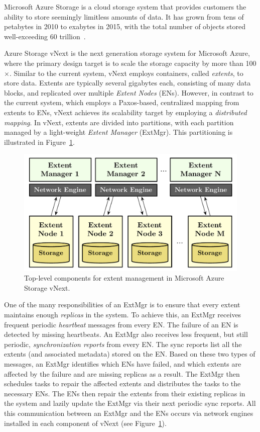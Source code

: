 Microsoft Azure Storage is a cloud storage system that provides customers the ability to store seemingly limitless amounts of data. It has grown from tens of petabytes in 2010 to exabytes in 2015, with the total number of objects stored well-exceeding 60 trillion~\cite{greenberg2015keynote}.

Azure Storage vNext is the next generation storage system for Microsoft Azure, where the primary design target is to scale the storage capacity by more than 100$\times$. Similar to the current system, vNext employs containers, called \emph{extents}, to store data. Extents are typically several gigabytes each, consisting of many data blocks, and replicated over multiple \emph{Extent Nodes} (ENs). However, in contrast to the current system, which employs a Paxos-based, centralized mapping from extents to ENs, vNext achieves its scalability target by employing a \emph{distributed mapping}. In vNext, extents are divided into partitions, with each partition managed by a light-weight \emph{Extent Manager} (ExtMgr). This partitioning is illustrated in Figure~\ref{fig:vnext}.

\begin{figure}[t]
\centering
\includegraphics[width=\linewidth]{img/azurestore}
\caption{Top-level components for extent management in Microsoft Azure Storage vNext.}
\label{fig:vnext}
\end{figure}

One of the many responsibilities of an ExtMgr is to ensure that every extent maintains enough \emph{replicas} in the system. To achieve this, an ExtMgr receives frequent periodic \emph{heartbeat} messages from every EN. The failure of an EN is detected by missing heartbeats. An ExtMgr also receives less frequent, but still periodic, \emph{synchronization reports} from every EN. The sync reports list all the extents (and associated metadata) stored on the EN. Based on these two types of messages, an ExtMgr identifies which ENs have failed, and which extents are affected by the failure and are missing replicas as a result. The ExtMgr then schedules tasks to repair the affected extents and distributes the tasks to the necessary ENs. The ENs then repair the extents from their existing replicas in the system and lazily update the ExtMgr via their next periodic sync reports. All this communication between an ExtMgr and the ENs occurs via network engines installed in each component of vNext (see Figure~\ref{fig:vnext}).

